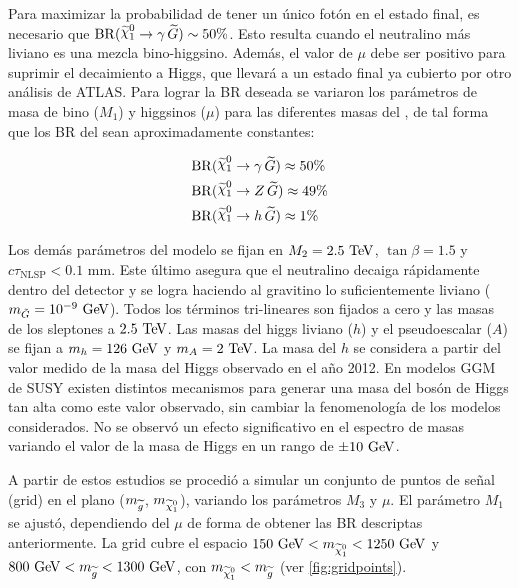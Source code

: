 Para maximizar la probabilidad de tener un único fotón en el estado final, es
necesario que $\mathrm{BR}(\ninoone \to \gam\,\gravino) \sim 50\%$. Esto resulta
cuando el neutralino más liviano es una mezcla bino-higgsino.
Además, el valor de $\mu$ debe ser positivo para
suprimir el decaimiento a Higgs, que llevará a un estado final ya cubierto por
otro análisis de ATLAS.
Para lograr la BR
deseada se variaron los parámetros de
masa de bino ($M_1$) y higgsinos ($\mu$) para las diferentes masas del {\ninoone}, de tal forma que los BR del {\ninoone}
sean aproximadamente constantes:

\begin{align}
  &\mathrm{BR}(\ninoone \to \gam\, \gravino) \approx 50\% \label{eq:n1_gam}\\
  &\mathrm{BR}(\ninoone \to Z\, \gravino) \approx 49\%    \label{eq:n1_z} \\
  &\mathrm{BR}(\ninoone \to h\, \gravino) \approx 1\%     \label{eq:n1_h}
\end{align}


Los demás parámetros del modelo se fijan en $M_2=2.5\tev$, $\tan\beta=1.5$ y
$c\tau_{\mathrm{NLSP}} < 0.1$ mm. Este último asegura que el neutralino decaiga
rápidamente dentro del detector y se logra haciendo al gravitino lo
suficientemente liviano ($m_{\tilde{G}}=10^{-9} \gev$). Todos los términos
tri-lineares son fijados a cero y las masas de los sleptones a $2.5 \tev$.
Las masas del higgs liviano ($h$) y el pseudoescalar ($A$) se fijan a
$m_{h} = 126 \gev$ y $m_{A} = 2 \tev$.
La masa del $h$ se considera a partir del valor
medido de la masa del Higgs observado en el a\~no 2012.
En modelos GGM de SUSY existen distintos
mecanismos\cite{Craig:2011yk,Auzzi:2011eu,Csaki:2012fh,Larsen:2012rq,Craig:2012hc}
para generar una masa del bosón de Higgs tan alta como este valor observado, sin
cambiar la fenomenología de los modelos considerados. No se observó un efecto
significativo en el espectro de masas variando el valor de la masa de Higgs en un
rango de $\pm 10 \gev$.

A partir de estos estudios se procedió a simular un conjunto de puntos de señal
(grid) en el plano ($m_{\widetilde{g}}$, $m_{\ninoone}$), variando los parámetros
$M_3$ y $\mu$. El parámetro $M_1$ se ajustó, dependiendo del $\mu$ de forma de
obtener las BR descriptas anteriormente. La grid cubre el espacio $150\gev <
m_{\ninoone} < 1250 \gev$ y $800\gev < m_{\gluino} < 1300 \gev$, con
$m_{\ninoone} < m_{\gluino}$ (ver \cref{fig:gridpoints}).


